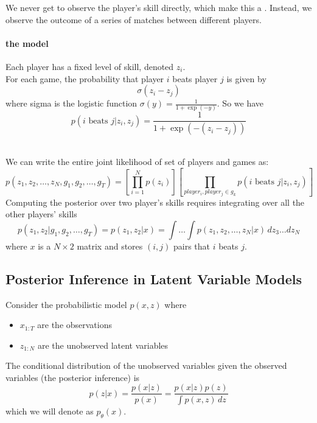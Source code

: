 \documentclass[11pt]{article}
\begin{document}
\remark
We never get to observe the player's skill directly, which make this a . Instead, we observe the outcome of a series of matches between different players.

\paragraph{the model}
Each player has a fixed level of skill, denoted $z_i$.\\
For each game, the probability that player $i$ beats player $j$ is given by
$$\sigma(z_i - z_j)$$
where sigma is the logistic function $\sigma(y) = \frac{1}{1 + \exp{(-y)}}$. So we have
$$p(i \text{ beats } j|z_i, z_j) = \frac{1}{1 + \exp{(-(z_i - z_j))}}$$

\remark
{}\\
We can write the entire joint likelihood of set of players and games as:
$$p(z_1, z_2, \hdots, z_N, g_1, g_2, \hdots, g_T) = \left[ \prod_{i=1}^N p(z_i)\right] \left[
 \prod_{player_i, player_j \in g_k} p( i \text{ beats }j |z_i, z_j)\right]$$
Computing the posterior over two player's skills requires integrating over all the other players' skills
$$p(z_1, z_2|g_1, g_2, \hdots,g_T) = p(z_1, z_2|x) = \int \hdots \int p(z_1, z_2, \hdots, z_N|x)\,dz_3 \hdots dz_N$$
where $x$ is a $N \times 2$ matrix and stores $(i, j)$ pairs that $i$ beats $j$.

\subsection{Posterior Inference in Latent Variable Models}
Consider the probabilistic model $p(x,z)$ where
\begin{itemize}
	\item $x_{1:T}$ are the observations
	\item $z_{1:N}$ are the unobserved latent variables
\end{itemize}
The conditional distribution of the unobserved variables given the observed variables (the posterior inference) is
$$p(z|x) = \frac{p(x|z)}{p(x)} = \frac{p(x|z)p(z)}{\int p(x,z)\,dz}$$
which we will denote as $p_\theta(x)$.\\
\end{document}
